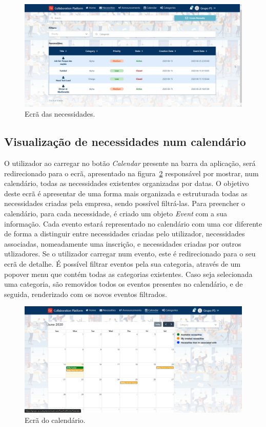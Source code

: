 \begin{figure}[H]
  \centering 
  \includegraphics[scale=0.3]{figures/NecessitiesGeneralScreen.png}
  \caption{Ecrã das necessidades.}\label{fig:NecessitiesScreen}
\end{figure}



\subsection{Visualização de necessidades num calendário}\label{subsec:implementacao:calendarNecessitiesView}

O utilizador ao carregar no botão \textit{Calendar} presente na barra da aplicação, será redirecionado para o ecrã, apresentado na figura~\ref{fig:CalendarScreen} responsável por mostrar, num calendário, todas as necessidades existentes organizadas por datas. 
O objetivo deste ecrã é apresentar de uma forma mais organizada e estruturada todas as necessidades criadas pela empresa, sendo possível filtrá-las. 
Para preencher o calendário, para cada necessidade, é criado um objeto \textit{Event} com a sua informação. 
Cada evento estará representado no calendário com uma cor diferente de forma a distinguir entre necessidades criadas pelo utilizador, necessidades associadas, nomeadamente uma inscrição, e necessidades criadas por outros utlizadores.
Se o utilizador carregar num evento, este é redirecionado para o seu ecrã de detalhe. 
É possível filtrar eventos pela sua categoria, através de um popover menu que contém todas as categorias existentes. 
Caso seja selecionada uma categoria, são removidos todos os eventos presentes no calendário, e de seguida, renderizado com os novos eventos filtrados.

\begin{figure}[H]
  \centering 
  \includegraphics[scale=0.4]{figures/Calendar.png}
  \caption{Ecrã do calendário.}\label{fig:CalendarScreen}
\end{figure}

